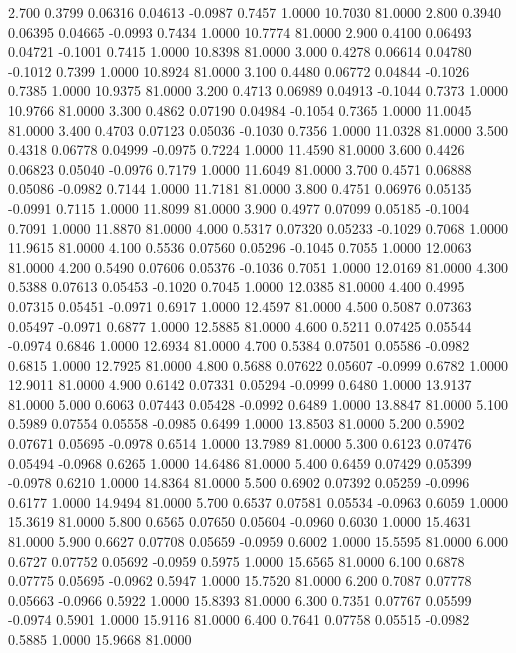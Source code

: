    2.700   0.3799   0.06316   0.04613  -0.0987   0.7457   1.0000  10.7030  81.0000
   2.800   0.3940   0.06395   0.04665  -0.0993   0.7434   1.0000  10.7774  81.0000
   2.900   0.4100   0.06493   0.04721  -0.1001   0.7415   1.0000  10.8398  81.0000
   3.000   0.4278   0.06614   0.04780  -0.1012   0.7399   1.0000  10.8924  81.0000
   3.100   0.4480   0.06772   0.04844  -0.1026   0.7385   1.0000  10.9375  81.0000
   3.200   0.4713   0.06989   0.04913  -0.1044   0.7373   1.0000  10.9766  81.0000
   3.300   0.4862   0.07190   0.04984  -0.1054   0.7365   1.0000  11.0045  81.0000
   3.400   0.4703   0.07123   0.05036  -0.1030   0.7356   1.0000  11.0328  81.0000
   3.500   0.4318   0.06778   0.04999  -0.0975   0.7224   1.0000  11.4590  81.0000
   3.600   0.4426   0.06823   0.05040  -0.0976   0.7179   1.0000  11.6049  81.0000
   3.700   0.4571   0.06888   0.05086  -0.0982   0.7144   1.0000  11.7181  81.0000
   3.800   0.4751   0.06976   0.05135  -0.0991   0.7115   1.0000  11.8099  81.0000
   3.900   0.4977   0.07099   0.05185  -0.1004   0.7091   1.0000  11.8870  81.0000
   4.000   0.5317   0.07320   0.05233  -0.1029   0.7068   1.0000  11.9615  81.0000
   4.100   0.5536   0.07560   0.05296  -0.1045   0.7055   1.0000  12.0063  81.0000
   4.200   0.5490   0.07606   0.05376  -0.1036   0.7051   1.0000  12.0169  81.0000
   4.300   0.5388   0.07613   0.05453  -0.1020   0.7045   1.0000  12.0385  81.0000
   4.400   0.4995   0.07315   0.05451  -0.0971   0.6917   1.0000  12.4597  81.0000
   4.500   0.5087   0.07363   0.05497  -0.0971   0.6877   1.0000  12.5885  81.0000
   4.600   0.5211   0.07425   0.05544  -0.0974   0.6846   1.0000  12.6934  81.0000
   4.700   0.5384   0.07501   0.05586  -0.0982   0.6815   1.0000  12.7925  81.0000
   4.800   0.5688   0.07622   0.05607  -0.0999   0.6782   1.0000  12.9011  81.0000
   4.900   0.6142   0.07331   0.05294  -0.0999   0.6480   1.0000  13.9137  81.0000
   5.000   0.6063   0.07443   0.05428  -0.0992   0.6489   1.0000  13.8847  81.0000
   5.100   0.5989   0.07554   0.05558  -0.0985   0.6499   1.0000  13.8503  81.0000
   5.200   0.5902   0.07671   0.05695  -0.0978   0.6514   1.0000  13.7989  81.0000
   5.300   0.6123   0.07476   0.05494  -0.0968   0.6265   1.0000  14.6486  81.0000
   5.400   0.6459   0.07429   0.05399  -0.0978   0.6210   1.0000  14.8364  81.0000
   5.500   0.6902   0.07392   0.05259  -0.0996   0.6177   1.0000  14.9494  81.0000
   5.700   0.6537   0.07581   0.05534  -0.0963   0.6059   1.0000  15.3619  81.0000
   5.800   0.6565   0.07650   0.05604  -0.0960   0.6030   1.0000  15.4631  81.0000
   5.900   0.6627   0.07708   0.05659  -0.0959   0.6002   1.0000  15.5595  81.0000
   6.000   0.6727   0.07752   0.05692  -0.0959   0.5975   1.0000  15.6565  81.0000
   6.100   0.6878   0.07775   0.05695  -0.0962   0.5947   1.0000  15.7520  81.0000
   6.200   0.7087   0.07778   0.05663  -0.0966   0.5922   1.0000  15.8393  81.0000
   6.300   0.7351   0.07767   0.05599  -0.0974   0.5901   1.0000  15.9116  81.0000
   6.400   0.7641   0.07758   0.05515  -0.0982   0.5885   1.0000  15.9668  81.0000
